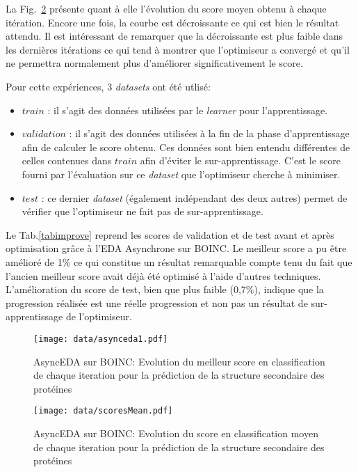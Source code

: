 \documentclass[a4paper, 11pt]{report}
\begin{document}
La Fig.~\ref{scoresMean} présente quant à elle l'évolution du score moyen obtenu à chaque itération. Encore une fois, la courbe est décroissante ce qui est bien le résultat attendu. Il est intéressant de remarquer que la décroissante est plus faible dans les dernières itérations ce qui tend à montrer que l'optimiseur a convergé et qu'il ne permettra normalement plus d'améliorer significativement le score.

Pour cette expériences, 3 \textit{datasets} ont été utlisé:
\begin{itemize}
\item $train$ : il s'agit des données utilisées par le \textit{learner} pour l'apprentissage. 
\item $validation$ : il s'agit des données utilisées à la fin de la phase d'apprentissage afin de calculer le score obtenu. Ces données sont bien entendu différentes de celles contenues dans $train$ afin d'éviter le sur-apprentissage. C'est le score fourni par l'évaluation sur ce \textit{dataset} que l'optimiseur cherche à minimiser.
\item $test$ : ce dernier \textit{dataset} (également indépendant des deux autres) permet de vérifier que l'optimiseur ne fait pas de sur-apprentissage.
\end{itemize}
Le Tab.\ref{tabimprove} reprend les scores de validation et de test avant et après optimisation grâce à l'EDA Asynchrone sur \textsc{BOINC}. Le meilleur score a pu être amélioré de 1\% ce qui constitue un résultat remarquable compte tenu du fait que l'ancien meilleur score avait déjà été optimisé à l'aide d'autres techniques. L'amélioration du score de test, bien que plus faible (0,7\%), indique que la progression réalisée est une réelle progression et non pas un résultat de sur-apprentissage de l'optimiseur. 

\begin{figure}[!h]
\centering
\texttt{[image: data/asynceda1.pdf]}	
\caption{AsyncEDA sur \textsc{BOINC}: Evolution du meilleur score en classification de chaque iteration pour la prédiction de la structure secondaire des protéines}
\label{asynceda1}
\end{figure}

\begin{figure}[!h]
\centering
\texttt{[image: data/scoresMean.pdf]}	
\caption{AsyncEDA sur \textsc{BOINC}: Evolution du score en classification moyen de chaque iteration pour la prédiction de la structure secondaire des protéines}
\label{scoresMean}
\end{figure}
\end{document}
